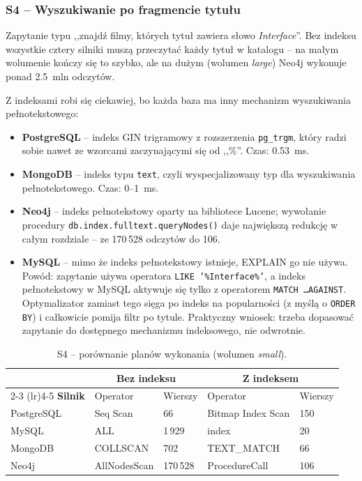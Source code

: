 \subsubsection*{S4 -- Wyszukiwanie po fragmencie tytułu}

Zapytanie typu ,,znajdź filmy, których tytuł zawiera słowo
\textit{Interface}''. Bez indeksu wszystkie cztery silniki muszą
przeczytać każdy tytuł w katalogu -- na małym wolumenie kończy się
to szybko, ale na dużym (wolumen \emph{large}) Neo4j wykonuje
ponad 2.5~mln odczytów.

Z indeksami robi się ciekawiej, bo każda baza ma inny mechanizm
wyszukiwania pełnotekstowego:

\begin{itemize}
    \item \textbf{PostgreSQL} -- indeks GIN trigramowy z rozszerzenia
    \texttt{pg\_trgm}, który radzi sobie nawet ze wzorcami
    zaczynającymi się od ,,\%''. Czas: 0.53~ms.
    \item \textbf{MongoDB} -- indeks typu \texttt{text}, czyli
    wyspecjalizowany typ dla wyszukiwania pełnotekstowego.
    Czas: 0--1~ms.
    \item \textbf{Neo4j} -- indeks pełnotekstowy oparty na
    bibliotece Lucene; wywołanie procedury
    \texttt{db.index.fulltext.queryNodes()} daje największą redukcję
    w całym rozdziale -- ze 170\,528 odczytów do 106.
    \item \textbf{MySQL} -- mimo że indeks pełnotekstowy istnieje,
    EXPLAIN go nie używa. Powód: zapytanie używa operatora
    \texttt{LIKE '\%Interface\%'}, a indeks pełnotekstowy w MySQL
    aktywuje się tylko z operatorem \texttt{MATCH \dots AGAINST}.
    Optymalizator zamiast tego sięga po indeks na popularności
    (z myślą o \texttt{ORDER BY}) i całkowicie pomija filtr po
    tytule. Praktyczny wniosek: trzeba dopasować zapytanie do
    dostępnego mechanizmu indeksowego, nie odwrotnie.
\end{itemize}

\begin{table}[H]
    \centering
    \small
    \begin{tabular}{lllll}
        \toprule
        & \multicolumn{2}{c}{\textbf{Bez indeksu}} & \multicolumn{2}{c}{\textbf{Z indeksem}} \\
        \cmidrule(lr){2-3} \cmidrule(lr){4-5}
        \textbf{Silnik} & Operator & Wierszy & Operator & Wierszy \\
        \midrule
        PostgreSQL & Seq Scan       & 66       & Bitmap Index Scan & 150 \\
        MySQL      & ALL            & 1\,929   & index             & 20 \\
        MongoDB    & COLLSCAN       & 702      & TEXT\_MATCH       & 66 \\
        Neo4j      & AllNodesScan   & 170\,528 & ProcedureCall     & 106 \\
        \bottomrule
    \end{tabular}
    \caption{S4 -- porównanie planów wykonania (wolumen \emph{small}).}
    \label{tab:explain_s4}
\end{table}

